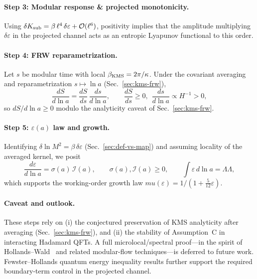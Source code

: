 \documentclass[aps,prd,onecolumn,superscriptaddress,nofootinbib]{revtex4-2}
\def\mu{mu}%
\def\Omega_\Lambda{OmegaLambda}%
\begin{document}
\paragraph{Step 3: Modular response \& projected monotonicity.}
Using \(\delta K_{\rm sub}=\beta\,\ell^4\,\delta\varepsilon+\mathcal O(\ell^6)\), positivity implies that the amplitude multiplying \(\delta\varepsilon\) in the projected channel acts as an entropic Lyapunov functional to this order.

\paragraph{Step 4: FRW reparametrization.}
Let \(s\) be modular time with local \(\beta_{\rm KMS}=2\pi/\kappa\). Under the covariant averaging and reparametrization \(s\mapsto \ln a\) (Sec.~\ref{sec:kms-frw}),
\[
\frac{dS}{d\ln a}=\frac{dS}{ds}\,\frac{ds}{d\ln a},\qquad \frac{dS}{ds}\ge 0,\ \ \frac{ds}{d\ln a}\propto H^{-1}>0,
\]
so \(dS/d\ln a\ge 0\) modulo the analyticity caveat of Sec.~\ref{sec:kms-frw}.

\paragraph{Step 5: \(\varepsilon(a)\) law and growth.}
Identifying \(\delta\ln M^2=\beta\,\delta\varepsilon\) (Sec.~\ref{sec:def-vs-map}) and assuming locality of the averaged kernel, we posit
\[
\frac{d\varepsilon}{d\ln a}=\sigma(a)\,\mathcal I(a),\qquad \sigma(a),\mathcal I(a)\ge 0,\qquad \int \varepsilon\,d\ln a=\Omega_\Lambda,
\]
which supports the working-order growth law \(\mu(\varepsilon)=1/(1+\tfrac{5}{12}\varepsilon)\).

\paragraph{Caveat and outlook.}
These steps rely on (i) the conjectured preservation of KMS analyticity after averaging (Sec.~\ref{sec:kms-frw}), and (ii) the stability of Assumption~C in interacting Hadamard QFTs. A full microlocal/spectral proof---in the spirit of Hollands--Wald~\cite{HollandsWald2001} and related modular-flow techniques---is deferred to future work. Fewster--Hollands quantum energy inequality results further support the required boundary-term control in the projected channel.

\end{document}
